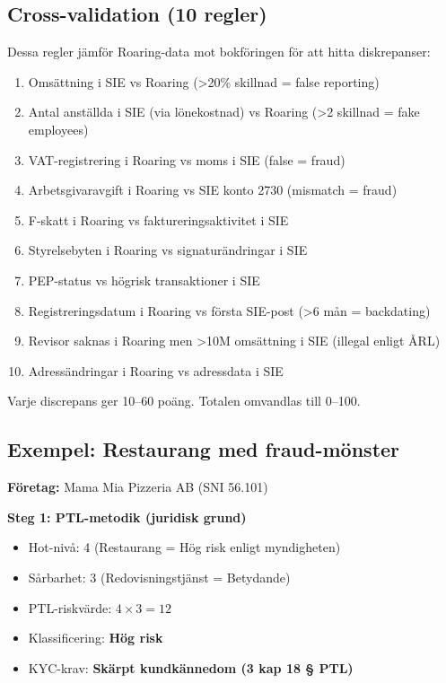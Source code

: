 \documentclass{article}
\begin{document}
\subsection*{Cross-validation (10 regler)}

Dessa regler jämför Roaring-data mot bokföringen för att hitta diskrepanser:

\begin{enumerate}
\item Omsättning i SIE vs Roaring (>20\% skillnad = false reporting)
\item Antal anställda i SIE (via lönekostnad) vs Roaring (>2 skillnad = fake employees)
\item VAT-registrering i Roaring vs moms i SIE (false = fraud)
\item Arbetsgivaravgift i Roaring vs SIE konto 2730 (mismatch = fraud)
\item F-skatt i Roaring vs faktureringsaktivitet i SIE
\item Styrelsebyten i Roaring vs signaturändringar i SIE
\item PEP-status vs högrisk transaktioner i SIE
\item Registreringsdatum i Roaring vs första SIE-post (>6 mån = backdating)
\item Revisor saknas i Roaring men >10M omsättning i SIE (illegal enligt ÅRL)
\item Adressändringar i Roaring vs adressdata i SIE
\end{enumerate}

Varje discrepans ger 10--60 poäng. Totalen omvandlas till 0--100.

\newpage
\subsection*{Exempel: Restaurang med fraud-mönster}

\textbf{Företag:} Mama Mia Pizzeria AB (SNI 56.101)

\textbf{Steg 1: PTL-metodik (juridisk grund)}

\begin{itemize}
\item Hot-nivå: 4 (Restaurang = Hög risk enligt myndigheten)
\item Sårbarhet: 3 (Redovisningstjänst = Betydande)
\item PTL-riskvärde: $4 \times 3 = 12$
\item Klassificering: \textbf{Hög risk}
\item KYC-krav: \textbf{Skärpt kundkännedom (3 kap 18 § PTL)}
\end{itemize}
\end{document}
